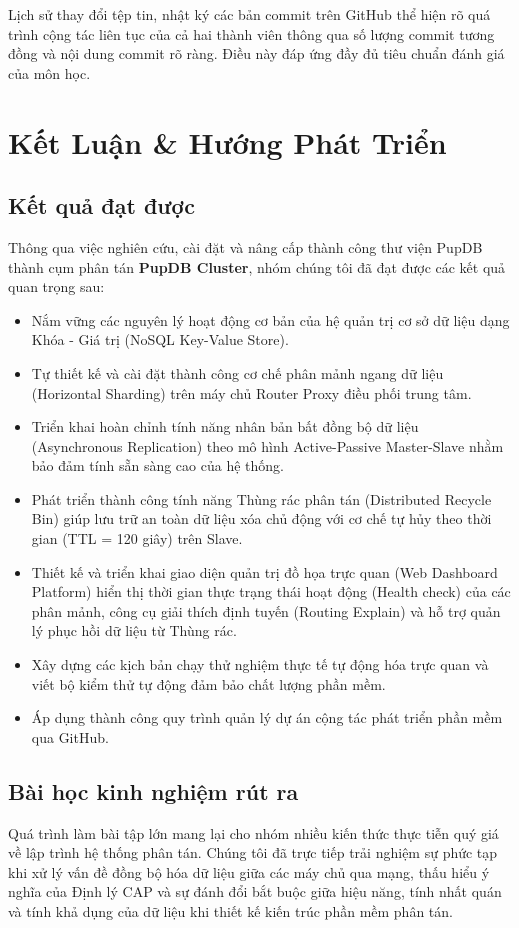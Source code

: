 \documentclass[12pt,a4paper]{report}
\begin{document}
Lịch sử thay đổi tệp tin, nhật ký các bản commit trên GitHub thể hiện rõ quá trình cộng tác liên tục của cả hai thành viên thông qua số lượng commit tương đồng và nội dung commit rõ ràng. Điều này đáp ứng đầy đủ tiêu chuẩn đánh giá của môn học.

\newpage

\chapter{Kết Luận \& Hướng Phát Triển}
\section{Kết quả đạt được}
Thông qua việc nghiên cứu, cài đặt và nâng cấp thành công thư viện PupDB thành cụm phân tán \textbf{PupDB Cluster}, nhóm chúng tôi đã đạt được các kết quả quan trọng sau:
\begin{itemize}
    \item Nắm vững các nguyên lý hoạt động cơ bản của hệ quản trị cơ sở dữ liệu dạng Khóa - Giá trị (NoSQL Key-Value Store).
    \item Tự thiết kế và cài đặt thành công cơ chế phân mảnh ngang dữ liệu (Horizontal Sharding) trên máy chủ Router Proxy điều phối trung tâm.
    \item Triển khai hoàn chỉnh tính năng nhân bản bất đồng bộ dữ liệu (Asynchronous Replication) theo mô hình Active-Passive Master-Slave nhằm bảo đảm tính sẵn sàng cao của hệ thống.
    \item Phát triển thành công tính năng Thùng rác phân tán (Distributed Recycle Bin) giúp lưu trữ an toàn dữ liệu xóa chủ động với cơ chế tự hủy theo thời gian (TTL = 120 giây) trên Slave.
    \item Thiết kế và triển khai giao diện quản trị đồ họa trực quan (Web Dashboard Platform) hiển thị thời gian thực trạng thái hoạt động (Health check) của các phân mảnh, công cụ giải thích định tuyến (Routing Explain) và hỗ trợ quản lý phục hồi dữ liệu từ Thùng rác.
    \item Xây dựng các kịch bản chạy thử nghiệm thực tế tự động hóa trực quan và viết bộ kiểm thử tự động đảm bảo chất lượng phần mềm.
    \item Áp dụng thành công quy trình quản lý dự án cộng tác phát triển phần mềm qua GitHub.
\end{itemize}

\section{Bài học kinh nghiệm rút ra}
Quá trình làm bài tập lớn mang lại cho nhóm nhiều kiến thức thực tiễn quý giá về lập trình hệ thống phân tán. Chúng tôi đã trực tiếp trải nghiệm sự phức tạp khi xử lý vấn đề đồng bộ hóa dữ liệu giữa các máy chủ qua mạng, thấu hiểu ý nghĩa của Định lý CAP và sự đánh đổi bắt buộc giữa hiệu năng, tính nhất quán và tính khả dụng của dữ liệu khi thiết kế kiến trúc phần mềm phân tán.
\end{document}
